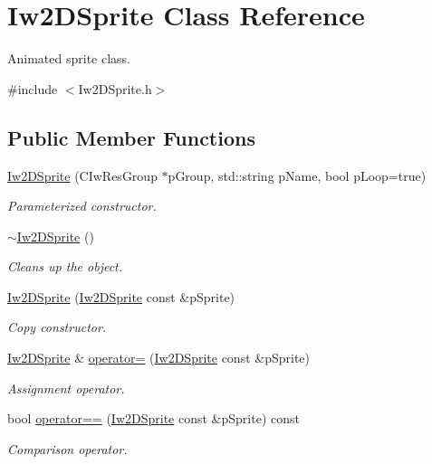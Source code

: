 \hypertarget{class_iw2_d_sprite}{
\section{Iw2DSprite Class Reference}
\label{class_iw2_d_sprite}
}


Animated sprite class.  




{\ttfamily \#include $<$Iw2DSprite.h$>$}

\subsection*{Public Member Functions}
\begin{DoxyCompactItemize}
\item 
\hyperlink{class_iw2_d_sprite_a13e7bb9e4cf276a8634391ebfac8f65c}{Iw2DSprite} (CIwResGroup $\ast$pGroup, std::string pName, bool pLoop=true)
\begin{DoxyCompactList}\small\item\em Parameterized constructor. \end{DoxyCompactList}\item 
\hyperlink{class_iw2_d_sprite_a09cc76bacd698f25ab0168a74565e671}{$\sim$Iw2DSprite} ()
\begin{DoxyCompactList}\small\item\em Cleans up the object. \end{DoxyCompactList}\item 
\hyperlink{class_iw2_d_sprite_ac22a662c231882f5fe1334d59d8d4af0}{Iw2DSprite} (\hyperlink{class_iw2_d_sprite}{Iw2DSprite} const \&pSprite)
\begin{DoxyCompactList}\small\item\em Copy constructor. \end{DoxyCompactList}\item 
\hyperlink{class_iw2_d_sprite}{Iw2DSprite} \& \hyperlink{class_iw2_d_sprite_aea789a36a92b82665153673fdea82761}{operator=} (\hyperlink{class_iw2_d_sprite}{Iw2DSprite} const \&pSprite)
\begin{DoxyCompactList}\small\item\em Assignment operator. \end{DoxyCompactList}\item 
bool \hyperlink{class_iw2_d_sprite_a5e5a538b9bcfddaf66175b4beb4a01da}{operator==} (\hyperlink{class_iw2_d_sprite}{Iw2DSprite} const \&pSprite) const 
\begin{DoxyCompactList}\small\item\em Comparison operator. \end{DoxyCompactList}\item 

\end{DoxyCompactItemize}
